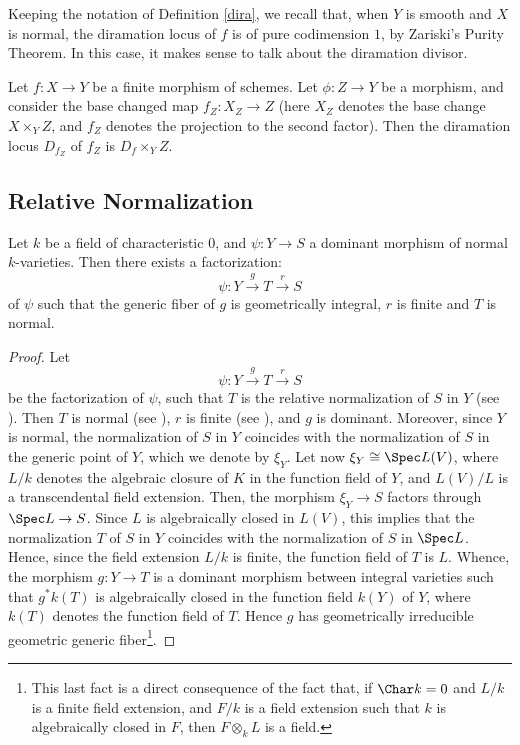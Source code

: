 \begin{remark}\label{Zariski}
	Keeping the notation of Definition \ref{dira}, we recall that, when $Y$ is smooth and $X$ is normal, the diramation locus of $f$ is of pure codimension $1$, by Zariski's Purity Theorem. In this case, it makes sense to talk about the diramation divisor.
\end{remark}

\begin{proposition}\label{ramification}
	Let $f:X \rightarrow Y$ be a finite morphism of schemes. Let $\phi: Z \rightarrow Y$ be a morphism, and consider the base changed map $f_Z:X_Z\rightarrow Z$ (here $X_Z$ denotes the base change $X\times_Y Z$, and $f_Z$ denotes the projection to the second factor).
	Then the diramation locus $D_{f_Z}$ of $f_Z$ is $D_f \times_Y Z$.
\end{proposition}


\subsection{Relative Normalization}

\begin{theorem}\label{Steinfactorization}
	Let $k$ be a field of characteristic $0$, and $\psi:Y \rightarrow S$ a dominant morphism of normal $k$-varieties. Then there exists a 
	factorization:
\[
\psi:Y\xrightarrow{g} T \xrightarrow{r} S
\]
of $\psi$ such that the generic fiber of $g$ is geometrically integral, $r$ is finite and $T$ is normal.
\end{theorem}
\begin{proof}
	Let
	\[
	\psi:Y\xrightarrow{g} T \xrightarrow{r} S
	\] 
	be the factorization of $\psi$, such that $T$ is the relative normalization of $S$ in $Y$ (see \cite[Tag 035H]{stacks-project}). Then $T$ is normal (see \cite[Tag 035L]{stacks-project}), $r$ is finite (see \cite[Tag 0AVK]{stacks-project}), and $g$ is dominant. Moreover, since $Y$ is normal, the normalization of $S$ in $Y$ coincides with the normalization of $S$ in the generic point of $Y$, which we denote by $\xi_Y$. Let now $\xi_Y \cong \Spec L(V)$, where $L/k$ denotes the algebraic closure of $K$ in the function field of $Y$, and $L(V)/L$ is a transcendental field extension. Then, the morphism $\xi_Y\rightarrow S$ factors through $\Spec L \rightarrow S$. Since $L$ is algebraically closed in $L(V)$, this implies that the normalization $T$ of $S$ in $Y$ coincides with the normalization of $S$ in $\Spec L$. Hence, since the field extension $L/k$ is finite, the function field of $T$ is $L$. Whence, the morphism $g:Y \rightarrow T$ is a dominant morphism between integral varieties such that $g^*k(T)$ is algebraically closed in the function field $k(Y)$ of $Y$, where $k(T)$ denotes the function field of $T$. Hence $g$ has geometrically irreducible geometric generic fiber\footnote{This last fact is a direct consequence of the fact that, if $\Char k = 0$ and $L/k$ is a finite field extension, and $F/k$ is a field extension such that $k$ is algebraically closed in $F$, then $F \otimes_k L$ is a field.}.
\end{proof}


